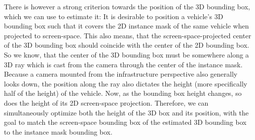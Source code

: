 There is however a strong criterion towards the position of the 3D bounding box, which we can use to estimate it: It is desirable to position a vehicle's 3D bounding box such that it covers the 2D instance mask of the same vehicle when projected to screen-space.
This also means, that the screen-space-projected center of the 3D bounding box should coincide with the center of the 2D bounding box.
So we know, that the center of the 3D bounding box must be somewhere along a 3D ray which is cast from the camera through the center of the instance mask.
Because a camera mounted from the infrastructure perspective also generally looks down, the position along the ray also dictates the height (more specifically half of the height) of the vehicle.
Now, as the bounding box height changes, so does the height of its 2D screen-space projection.
Therefore, we can simultaneously optimize both the height of the 3D box and its position, with the goal to match the screen-space bounding box of the estimated 3D bounding box to the instance mask bounding box.

